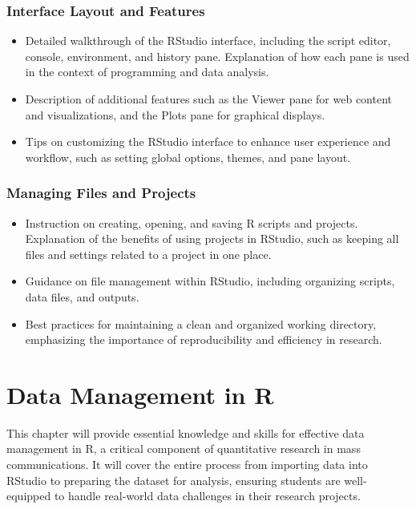 \documentclass[
]{book}
\begin{document}
\hypertarget{interface-layout-and-features}{%
\subsection*{Interface Layout and Features}\label{interface-layout-and-features}}

\begin{itemize}
\item
  Detailed walkthrough of the RStudio interface, including the script editor, console, environment, and history pane. Explanation of how each pane is used in the context of programming and data analysis.
\item
  Description of additional features such as the Viewer pane for web content and visualizations, and the Plots pane for graphical displays.
\item
  Tips on customizing the RStudio interface to enhance user experience and workflow, such as setting global options, themes, and pane layout.
\end{itemize}

\hypertarget{managing-files-and-projects}{%
\subsection*{Managing Files and Projects}\label{managing-files-and-projects}}

\begin{itemize}
\item
  Instruction on creating, opening, and saving R scripts and projects. Explanation of the benefits of using projects in RStudio, such as keeping all files and settings related to a project in one place.
\item
  Guidance on file management within RStudio, including organizing scripts, data files, and outputs.
\item
  Best practices for maintaining a clean and organized working directory, emphasizing the importance of reproducibility and efficiency in research.
\end{itemize}

\hypertarget{data-management-in-r}{%
\chapter{Data Management in R}\label{data-management-in-r}}

This chapter will provide essential knowledge and skills for effective data management in R, a critical component of quantitative research in mass communications. It will cover the entire process from importing data into RStudio to preparing the dataset for analysis, ensuring students are well-equipped to handle real-world data challenges in their research projects.
\end{document}
